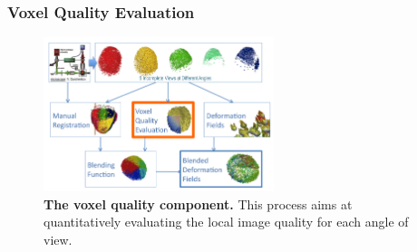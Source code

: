\subsubsection{Voxel Quality Evaluation  }
\begin{figure}
\begin{center}
\includegraphics[width=0.6\textwidth]{../../images/Reconstruction/washington/workflow_vqe_corrected.png}
\end{center}
\caption{\textbf{The voxel quality component.} This process aims at quantitatively evaluating the local image quality for each angle of view. }
\label{washington_workflow_vqe}
\end{figure}

